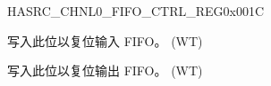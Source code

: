 \begin{register}{H}{ASRC\_CHNL0\_FIFO\_CTRL\_REG}{0x001C}\label{regdesc:ASRCCHNL0FIFOCTRLREG}
%
%
%
\regnewline%
\begin{regdesc}\begin{reglist}
\label{fielddesc:ASRCCHNL0INFIFORESET}\item [ASRC\_CHNL0\_INFIFO\_RESET] 写入此位以复位输入 FIFO。 (WT)
\label{fielddesc:ASRCCHNL0OUTFIFORESET}\item [ASRC\_CHNL0\_OUTFIFO\_RESET] 写入此位以复位输出 FIFO。 (WT)


\end{reglist}\end{regdesc}
\end{register}


